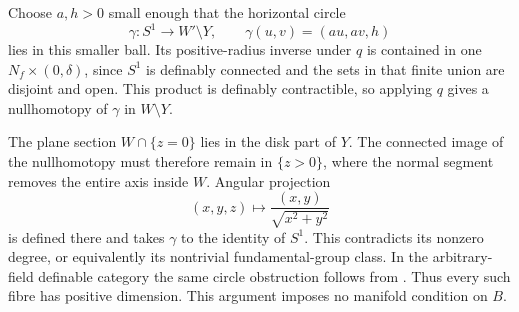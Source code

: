 Choose $a,h>0$ small enough that the horizontal circle
\[
 \gamma:S^1\longrightarrow W'\setminus Y,
 \qquad \gamma(u,v)=(au,av,h)
\]
lies in this smaller ball.
Its positive-radius inverse under $q$ is contained in one
$N_f\times(0,\delta)$, since $S^1$ is definably connected and the
sets in that finite union are disjoint and open.
This product is definably contractible, so applying $q$ gives a
nullhomotopy of $\gamma$ in $W\setminus Y$.

The plane section $W\cap\{z=0\}$ lies in the disk part of $Y$.
The connected image of the nullhomotopy must therefore remain in
$\{z>0\}$, where the normal segment removes the entire axis inside
$W$.  Angular projection
\[
 (x,y,z)\longmapsto
 \frac{(x,y)}{\sqrt{x^2+y^2}}
\]
is defined there and takes $\gamma$ to the identity of $S^1$.
This contradicts its nonzero degree, or equivalently its nontrivial
fundamental-group class.  In the arbitrary-field definable category
the same circle obstruction follows from
\cite[Corollary~3.4, author version p.~8]{BaroOtero2008v1}.
Thus every such fibre has positive dimension.
This argument imposes no manifold condition on $B$.

